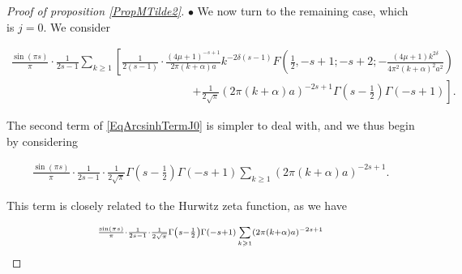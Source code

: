 \documentclass{jams-l}
\theoremstyle{definition}
\theoremstyle{remark}
\numberwithin{equation}{section}
\begin{document}
\begin{proof}[Proof of proposition \ref{PropMTilde2}]
                        
                        \medskip
                        
                        
                    \hspace{10pt} $\bullet$ We now turn to the remaining case, which is $j = 0$. We consider
                    
                        \begin{equation}
                        \label{EqArcsinhTermJ0}
                            \begin{array}{l}
                                \scriptstyle \frac{\sin \left( \pi s \right)}{\pi} \cdot \frac{1}{2s-1} \sum\limits_{k \geqslant 1} \left[ \frac{1}{2 \left( s-1 \right)} \cdot \frac{\left( 4 \mu + 1 \right)^{-s+1}}{2 \pi \left( k + \alpha \right) a} k^{-2\delta \left( s-1 \right)} F \left( \frac{1}{2}, -s+1; -s+2;  - \frac{\left( 4  \mu + 1 \right) k^{2 \delta}}{4 \pi^2 \left( k + \alpha \right)^2 a^2} \right) \right. \\[0.5em]
                                
                                \qquad \qquad \qquad \qquad \qquad \qquad \qquad \qquad \scriptstyle \left. + \frac{1}{2 \sqrt{\pi}} \left( 2 \pi \left( k + \alpha \right) a \right)^{-2s+1} \Gamma \left( s- \frac{1}{2} \right) \Gamma \left( -s+1 \right) \right].
                            \end{array}
                        \end{equation}
                        
                        \noindent The second term of \eqref{EqArcsinhTermJ0} is simpler to deal with, and we thus begin by considering
                        
                        \[ \begin{array}{c}
                                \frac{\sin \left( \pi s \right)}{\pi} \cdot \frac{1}{2s-1} \cdot \frac{1}{2 \sqrt{\pi}} \Gamma \left( s - \frac{1}{2} \right) \Gamma \left( -s+1 \right) \sum\limits_{k \geqslant 1} \left( 2 \pi \left( k + \alpha \right) a \right)^{-2s+1}.
                            \end{array} \]
                        
                        \noindent This term is closely related to the Hurwitz zeta function, as we have
                        
                        \[ \begin{array}{lll}
                                \multicolumn{3}{l}{\scriptstyle \frac{\sin \left( \pi s \right)}{\pi} \cdot \frac{1}{2s-1} \cdot \frac{1}{2 \sqrt{\pi}} \Gamma \left( s - \frac{1}{2} \right) \Gamma \left( -s+1 \right) \sum\limits_{k \geqslant 1} \left( 2 \pi \left( k + \alpha \right) a \right)^{-2s+1}} \\[0.5em]
                                

\end{array}\]
\end{proof}
\end{document}
